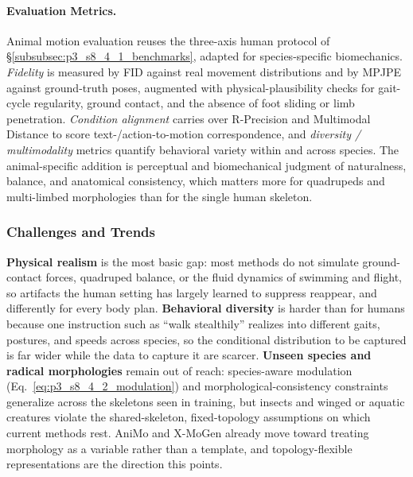 \paragraph{Evaluation Metrics.} Animal motion evaluation reuses the three-axis human protocol of §\ref{subsubsec:p3_s8_4_1_benchmarks}, adapted for species-specific biomechanics.
\emph{Fidelity} is measured by FID against real movement distributions and by MPJPE against ground-truth poses, augmented with physical-plausibility checks for gait-cycle regularity, ground contact, and the absence of foot sliding or limb penetration.
\emph{Condition alignment} carries over R-Precision and Multimodal Distance to score text-/action-to-motion correspondence, and \emph{diversity / multimodality} metrics quantify behavioral variety within and across species. The animal-specific addition is perceptual and biomechanical judgment of naturalness, balance, and anatomical consistency, which matters more for quadrupeds and multi-limbed morphologies than for the single human skeleton.



\subsubsection{Challenges and Trends}
\label{subsubsec:p3_s8_4_2_challenges}
\textbf{Physical realism} is the most basic gap: most methods do not simulate ground-contact forces, quadruped balance, or the fluid dynamics of swimming and flight, so artifacts the human setting has largely learned to suppress reappear, and differently for every body plan.
\textbf{Behavioral diversity} is harder than for humans because one instruction such as ``walk stealthily'' realizes into different gaits, postures, and speeds across species, so the conditional distribution to be captured is far wider while the data to capture it are scarcer.
\textbf{Unseen species and radical morphologies} remain out of reach: species-aware modulation (Eq.~\eqref{eq:p3_s8_4_2_modulation}) and morphological-consistency constraints generalize across the skeletons seen in training, but insects and winged or aquatic creatures violate the shared-skeleton, fixed-topology assumptions on which current methods rest.
AniMo and X-MoGen already move toward treating morphology as a variable rather than a template, and topology-flexible representations are the direction this points.




